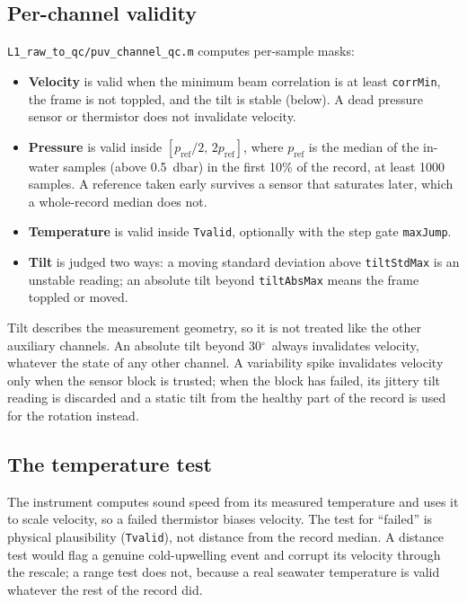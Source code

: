\documentclass[11pt]{article}
\newcommand{\code}[1]{\texttt{#1}}
\providecommand{\degree}{\ensuremath{^{\circ}}}
\begin{document}
\subsection{Per-channel validity}

\code{L1\_raw\_to\_qc/puv\_channel\_qc.m} computes per-sample masks:
\begin{itemize}
\item \textbf{Velocity} is valid when the minimum beam correlation is at least \code{corrMin},
  the frame is not toppled, and the tilt is stable (below). A dead pressure sensor or
  thermistor does not invalidate velocity.
\item \textbf{Pressure} is valid inside $[p_\text{ref}/2,\, 2p_\text{ref}]$, where $p_\text{ref}$
  is the median of the in-water samples (above 0.5~dbar) in the first 10\% of the record, at
  least 1000 samples. A reference taken early survives a sensor that saturates later, which a
  whole-record median does not.
\item \textbf{Temperature} is valid inside \code{Tvalid}, optionally with the step gate
  \code{maxJump}.
\item \textbf{Tilt} is judged two ways: a moving standard deviation above \code{tiltStdMax} is
  an unstable reading; an absolute tilt beyond \code{tiltAbsMax} means the frame toppled or moved.
\end{itemize}

\noindent
Tilt describes the measurement geometry, so it is not treated like the other auxiliary
channels. An absolute tilt beyond 30\degree\ always invalidates velocity, whatever the state of
any other channel. A variability spike invalidates velocity only when the sensor block is
trusted; when the block has failed, its jittery tilt reading is discarded and a static tilt from
the healthy part of the record is used for the rotation instead.

\subsection{The temperature test}
\label{sec:tvalid}

The instrument computes sound speed from its measured temperature and uses it to scale
velocity, so a failed thermistor biases velocity. The test for ``failed'' is physical
plausibility (\code{Tvalid}), not distance from the record median. A distance test would flag a
genuine cold-upwelling event and corrupt its velocity through the rescale; a range test does
not, because a real seawater temperature is valid whatever the rest of the record did.
\end{document}
